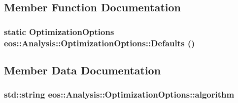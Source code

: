 \subsection{Member Function Documentation}
\hypertarget{structeos_1_1Analysis_1_1OptimizationOptions_a809f9cf0f5d544c7303a631c278c3fa1}{
\subsubsection[{Defaults}]{\setlength{\rightskip}{0pt plus 5cm}static {\bf OptimizationOptions} eos::Analysis::OptimizationOptions::Defaults ()}}
\label{structeos_1_1Analysis_1_1OptimizationOptions_a809f9cf0f5d544c7303a631c278c3fa1}


\subsection{Member Data Documentation}
\hypertarget{structeos_1_1Analysis_1_1OptimizationOptions_a3917de66192096f736ac764b69d9acbc}{
\subsubsection[{algorithm}]{\setlength{\rightskip}{0pt plus 5cm}std::string {\bf eos::Analysis::OptimizationOptions::algorithm}}}
\label{structeos_1_1Analysis_1_1OptimizationOptions_a3917de66192096f736ac764b69d9acbc}


